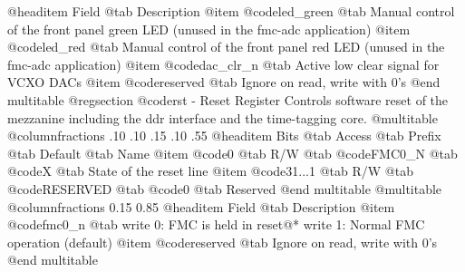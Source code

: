 @headitem Field @tab Description
@item @code{led_green} @tab Manual control of the front panel green LED (unused in the fmc-adc application)
@item @code{led_red} @tab Manual control of the front panel red LED (unused in the fmc-adc application)
@item @code{dac_clr_n} @tab Active low clear signal for VCXO DACs
@item @code{reserved} @tab Ignore on read, write with 0's
@end multitable
@regsection @code{rst} - Reset Register
Controls software reset of the mezzanine including the ddr interface and the time-tagging core.
@multitable @columnfractions .10 .10 .15 .10 .55
@headitem Bits @tab Access @tab Prefix @tab Default @tab Name
@item @code{0}
@tab R/W @tab
@code{FMC0_N}
@tab @code{X} @tab 
State of the reset line
@item @code{31...1}
@tab R/W @tab
@code{RESERVED}
@tab @code{0} @tab 
Reserved
@end multitable
@multitable @columnfractions 0.15 0.85
@headitem Field @tab Description
@item @code{fmc0_n} @tab write 0: FMC is held in reset@* write 1: Normal FMC operation (default)
@item @code{reserved} @tab Ignore on read, write with 0's
@end multitable
